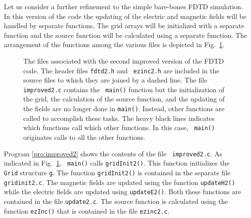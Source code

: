 Let us consider a further refinement to the simple bare-bones FDTD
simulation.  In this version of the code the updating of the electric
and magnetic fields will be handled by separate functions.  The grid
arrays will be initialized with a separate function and the source
function will be calculated using a separate function.  The
arrangement of the functions among the various files is depicted in
Fig.\ \ref{fig:improved2Files}.
\begin{figure}
  \begin{center}
\end{center} \caption{The files associated with the second improved
  version of the FDTD code.  The header files {\tt fdtd2.h} and {\tt
    ezinc2.h} are included in the source files to which they are joined
  by a dashed line.  The file {\tt improved2.c} contains the {\tt
    main()} function but the initialization of the grid, the
  calculation of the source function, and the updating of the fields
  are no longer done in {\tt main()}.  Instead, other functions are
  called to accomplish these tasks.  The heavy black lines indicates
  which functions call which other functions.  In this case, {\tt
    main()} originates calls to all the other
  functions.}  \label{fig:improved2Files}
\end{figure}

Program \ref{pro:improved2} shows the contents of the file {\tt
  improved2.c}.  As indicated in Fig.\ \ref{fig:improved2Files}, {\tt
  main()} calls {\tt gridInit2()}.  This function initializes the {\tt
  Grid} structure {\tt g}.  The function {\tt gridInit2()} is
contained in the separate file {\tt gridinit2.c}.  The magnetic fields
are updated using the function {\tt updateH2()} while the electric
fields are updated using {\tt updateE2()}.  Both these functions are
contained in the file {\tt update2.c}.  The source function is
calculated using the function {\tt ezInc()} that is contained in the
file {\tt ezinc2.c}.


